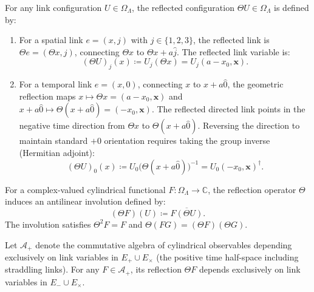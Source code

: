 \begin{definition}
For any link configuration $U \in \Omega_\Lambda$, the reflected configuration $\Theta U \in \Omega_\Lambda$ is defined by:
\begin{enumerate}
    \item For a spatial link $e = (x, j)$ with $j \in \{1, 2, 3\}$, the reflected link is $\Theta e = (\Theta x, j)$, connecting $\Theta x$ to $\Theta x + a\hat{j}$. The reflected link variable is:
    \begin{equation}
    \label{eq:theta_spatial_link}
    (\Theta U)_j(x) \coloneqq U_j(\Theta x) = U_j(a - x_0, \mathbf{x}).
    \end{equation}
    \item For a temporal link $e = (x, 0)$, connecting $x$ to $x + a\hat{0}$, the geometric reflection maps $x \mapsto \Theta x = (a - x_0, \mathbf{x})$ and $x + a\hat{0} \mapsto \Theta(x + a\hat{0}) = (-x_0, \mathbf{x})$. The reflected directed link points in the negative time direction from $\Theta x$ to $\Theta(x + a\hat{0})$. Reversing the direction to maintain standard $+0$ orientation requires taking the group inverse (Hermitian adjoint):
    \begin{equation}
    \label{eq:theta_temporal_link}
    (\Theta U)_0(x) \coloneqq U_0\bigl( \Theta(x + a\hat{0}) \bigr)^{-1} = U_0(-x_0, \mathbf{x})^\dagger.
    \end{equation}
\end{enumerate}
\end{definition}

For a complex-valued cylindrical functional $F : \Omega_\Lambda \to \mathbb{C}$, the reflection operator $\Theta$ induces an antilinear involution defined by:
\begin{equation}
\label{eq:theta_functional_involution}
(\Theta F)(U) \coloneqq \overline{F(\Theta U)}.
\end{equation}
The involution satisfies $\Theta^2 F = F$ and $\Theta(F G) = (\Theta F)(\Theta G)$.

Let $\mathcal{A}_+$ denote the commutative algebra of cylindrical observables depending exclusively on link variables in $E_+ \cup E_\times$ (the positive time half-space including straddling links). For any $F \in \mathcal{A}_+$, its reflection $\Theta F$ depends exclusively on link variables in $E_- \cup E_\times$.

